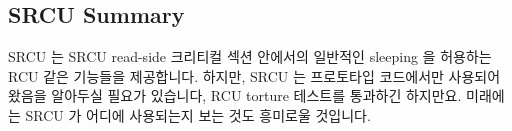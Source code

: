 \subsection{SRCU Summary}
\label{sec:app:rcuimpl:SRCU Summary}

SRCU 는 SRCU read-side 크리티컬 섹션 안에서의 일반적인 sleeping 을 허용하는 RCU
같은 기능들을 제공합니다.
하지만, SRCU 는 프로토타입 코드에서만 사용되어왔음을 알아두실 필요가 있습니다,
RCU torture 테스트를 통과하긴 하지만요.
미래에는 SRCU 가 어디에 사용되는지 보는 것도 흥미로울 것입니다.

